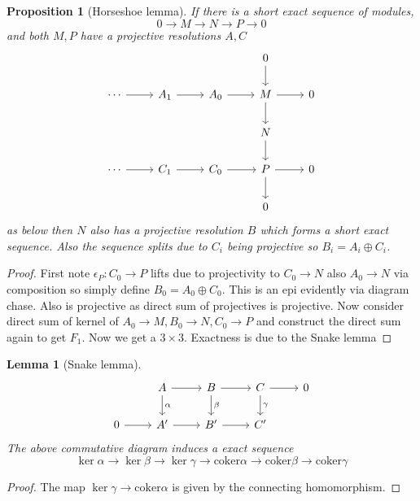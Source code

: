 \documentclass[12pt]{article}
\numberwithin{equation}{section}
\newtheorem{lemma}[theorem]{Lemma}
\newtheorem{proposition}{Proposition}[section]
\begin{document}
	\begin{proposition}[Horseshoe lemma]
		If there is a short exact sequence of modules,
		\[ 0 \to M \to N \to P \to 0 \]
		and both $M,P$ have a projective resolutions $A, C$ 
		\[\begin{tikzcd}
			&&& 0 \\
			\cdots & {A_1} & {A_0} & M & 0 \\
			&&& N \\
			\cdots & {C_1} & {C_0} & P & 0 \\
			&&& 0
			\arrow[from=2-4, to=2-5]
			\arrow[from=1-4, to=2-4]
			\arrow[from=2-4, to=3-4]
			\arrow[from=3-4, to=4-4]
			\arrow[from=4-4, to=4-5]
			\arrow[from=4-4, to=5-4]
			\arrow[ from=4-3, to=4-4]
			\arrow[ from=2-3, to=2-4]
			\arrow[from=2-1, to=2-2]
			\arrow[from=2-2, to=2-3]
			\arrow[from=4-1, to=4-2]
			\arrow[from=4-2, to=4-3]
		\end{tikzcd}\]
		as below then $N$ also has a projective resolution $B$ which forms a short exact sequence. Also the sequence splits due to $C_i$ being projective so $B_i=A_i \oplus C_i$.
	\end{proposition}
	\begin{proof}
			First note $\epsilon_P: C_0 \to P$ lifts due to projectivity to $C_0 \to N$ also $A_0\to N$ via composition so simply define $B_0 = A_0 \oplus C_0$. This is an epi evidently via diagram chase. Also is projective as direct sum of projectives is projective. Now consider direct sum of kernel of $A_0 \to M, B_0 \to N, C_0 \to P$ and construct the direct sum again to get $F_1$.	Now we get a $3\times 3$. Exactness is due to the Snake lemma
	\end{proof}
	
	\begin{lemma}[Snake lemma]
		\[\begin{tikzcd}
			& A & B & C & 0 \\
			0 & {A'} & {B'} & {C'}
			\arrow[from=1-2, to=1-3]
			\arrow[from=1-3, to=1-4]
			\arrow[from=1-4, to=1-5]
			\arrow[from=2-1, to=2-2]
			\arrow[from=2-2, to=2-3]
			\arrow[from=2-3, to=2-4]
			\arrow["\alpha", from=1-2, to=2-2]
			\arrow["\beta", from=1-3, to=2-3]
			\arrow["\gamma", from=1-4, to=2-4]
		\end{tikzcd}\]
		The above commutative diagram induces a exact sequence \[ \ker \alpha \to \ker \beta \to \ker \gamma \to \mathrm{coker}\alpha \to \mathrm{coker}\beta \to \mathrm{coker}\gamma \]
	\end{lemma}
	\begin{proof}
		The map $\ker \gamma \to \mathrm{coker} \alpha $ is given by the connecting homomorphism.
	\end{proof}
	
\end{document}
